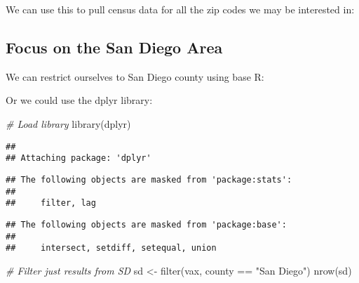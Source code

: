 \documentclass[
]{article}
\newenvironment{Shaded}{\begin{snugshade}}{\end{snugshade}}
\newcommand{\CommentTok}[1]{\textcolor[rgb]{0.56,0.35,0.01}{\textit{#1}}}
\newcommand{\FunctionTok}[1]{\textcolor[rgb]{0.00,0.00,0.00}{#1}}
\newcommand{\NormalTok}[1]{#1}
\newcommand{\OtherTok}[1]{\textcolor[rgb]{0.56,0.35,0.01}{#1}}
\newcommand{\SpecialCharTok}[1]{\textcolor[rgb]{0.00,0.00,0.00}{#1}}
\newcommand{\StringTok}[1]{\textcolor[rgb]{0.31,0.60,0.02}{#1}}
\begin{document}
We can use this to pull census data for all the zip codes we may be
interested in:

\begin{Shaded}
\end{Shaded}

\hypertarget{focus-on-the-san-diego-area}{%
\subsection{Focus on the San Diego
Area}\label{focus-on-the-san-diego-area}}

We can restrict ourselves to San Diego county using base R:

\begin{Shaded}
\end{Shaded}

Or we could use the dplyr library:

\begin{Shaded}
\begin{Highlighting}[]
\CommentTok{\# Load library}
\FunctionTok{library}\NormalTok{(dplyr)}
\end{Highlighting}
\end{Shaded}

\begin{verbatim}
## 
## Attaching package: 'dplyr'
\end{verbatim}

\begin{verbatim}
## The following objects are masked from 'package:stats':
## 
##     filter, lag
\end{verbatim}

\begin{verbatim}
## The following objects are masked from 'package:base':
## 
##     intersect, setdiff, setequal, union
\end{verbatim}

\begin{Shaded}
\begin{Highlighting}[]
\CommentTok{\# Filter just results from SD}
\NormalTok{sd }\OtherTok{\textless{}{-}} \FunctionTok{filter}\NormalTok{(vax, county }\SpecialCharTok{==} \StringTok{"San Diego"}\NormalTok{)}
\FunctionTok{nrow}\NormalTok{(sd)}
\end{Highlighting}
\end{Shaded}
\end{document}
